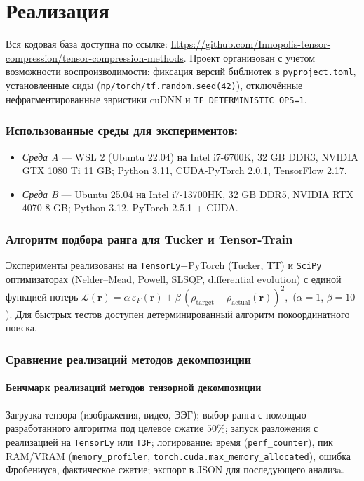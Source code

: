 \chapter{Реализация}
\label{chap:implementation}

Вся кодовая база доступна по ссылке: \url{https://github.com/Innopolis-tensor-compression/tensor-compression-methods}. Проект организован с учетом возможности воспроизводимости: фиксация версий библиотек в \texttt{pyproject.toml}, установленные сиды (\texttt{np/torch/tf.random.seed(42)}), отключённые нефрагментированные эвристики cuDNN и \texttt{TF\_DETERMINISTIC\_OPS=1}.

\begingroup
\sloppy
\subsection*{Использованные среды для экспериментов:}
\begin{itemize}\setlength\itemsep{0.15em}
    \item \emph{Среда A} — WSL 2 (Ubuntu 22.04) на Intel i7-6700K, 32 GB DDR3, NVIDIA GTX 1080 Ti 11 GB; Python 3.11, CUDA-PyTorch 2.0.1, TensorFlow 2.17.  
    \item \emph{Среда B} — Ubuntu 25.04 на Intel i7-13700HK, 32 GB DDR5, NVIDIA RTX 4070 8 GB; Python 3.12, PyTorch 2.5.1 + CUDA.  
\end{itemize}
\endgroup


\subsection*{Алгоритм подбора ранга для Tucker и Tensor-Train}  
Эксперименты реализованы на \texttt{TensorLy}+PyTorch (Tucker, TT) и \texttt{SciPy} оптимизаторах (Nelder–Mead, Powell, SLSQP, differential evolution) с единой функцией потерь $\mathcal{L}(\mathbf r)=
\alpha\,\varepsilon_F(\mathbf r)+
\beta\,(\rho_{\text{target}}-\rho_{\text{actual}}(\mathbf r))^{2},$ ($\alpha{=}1$, $\beta{=}10$).  Для быстрых тестов доступен детерминированный алгоритм покоординатного поиска.

\subsection*{Сравнение реализаций методов декомпозиции}

\subsubsection*{Бенчмарк реализаций методов тензорной декомпозиции}
\begingroup
\sloppy
Загрузка тензора (изображения, видео, ЭЭГ); выбор ранга с помощью разработанного алгоритма под целевое сжатие $50\%$; запуск разложения с реализацией на \texttt{TensorLy} или \texttt{T3F}; логирование: время (\texttt{perf\_counter}), пик RAM/V\!RAM (\texttt{memory\_profiler}, \texttt{torch.cuda.max\_memory\_allocated}), ошибка Фробениуса, фактическое сжатие; экспорт в JSON для последующего анализa.  
\endgroup

